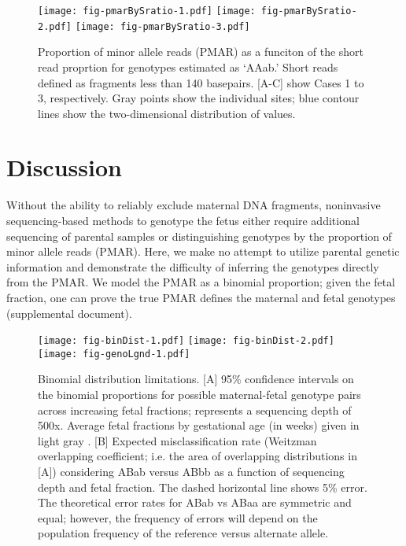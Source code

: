 \documentclass{article}\usepackage[]{graphicx}\usepackage[]{color}
\begin{document}
\begin{figure}
  \centering
  \texttt{[image: fig-pmarBySratio-1.pdf]}%
  \texttt{[image: fig-pmarBySratio-2.pdf]}%
  \texttt{[image: fig-pmarBySratio-3.pdf]}
  \caption{Proportion of minor allele reads (PMAR) as a funciton of the short read proprtion for genotypes estimated as `AAab.' Short reads defined as fragments less than 140 basepairs. [A-C] show Cases 1 to 3, respectively. Gray points show the individual sites; blue contour lines show the two-dimensional distribution of values.}
  \label{fig:pmarBySratio}
\end{figure}

\section{Discussion}

Without the ability to reliably exclude maternal DNA fragments, noninvasive sequencing-based methods to genotype the fetus either require additional sequencing of parental samples or distinguishing genotypes by the proportion of minor allele reads (PMAR).
Here, we make no attempt to utilize parental genetic information and demonstrate the difficulty of inferring the genotypes directly from the PMAR.
We model the PMAR as a binomial proportion; given the fetal fraction, one can prove the true PMAR defines the maternal and fetal genotypes (supplemental document).

\begin{figure}
  \centering
  \texttt{[image: fig-binDist-1.pdf]}%
  \texttt{[image: fig-binDist-2.pdf]}
  \texttt{[image: fig-genoLgnd-1.pdf]}
  \caption{Binomial distribution limitations. [A] 95\% confidence intervals on the binomial proportions for possible maternal-fetal genotype pairs across increasing fetal fractions; represents a sequencing depth of 500x. Average fetal fractions by gestational age (in weeks) given in light gray \cite{kinnings:2015aa}. [B] Expected misclassification rate (Weitzman overlapping coefficient; i.e. the area of overlapping distributions in [A]) considering ABab versus ABbb as a function of sequencing depth and fetal fraction. The dashed horizontal line shows 5\% error. The theoretical error rates for ABab vs ABaa are symmetric and equal; however, the frequency of errors will depend on the population frequency of the reference versus alternate allele.}
  \label{fig:binDist}
\end{figure}
\end{document}
